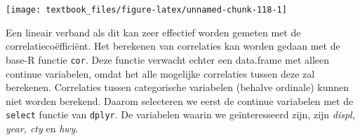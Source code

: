 \documentclass[]{tufte-book}
\newenvironment{Shaded}{}{}
\newcommand{\KeywordTok}[1]{\textcolor[rgb]{0.00,0.44,0.13}{\textbf{#1}}}
\newcommand{\NormalTok}[1]{#1}
\newcommand{\OperatorTok}[1]{\textcolor[rgb]{0.40,0.40,0.40}{#1}}
\newcommand{\StringTok}[1]{\textcolor[rgb]{0.25,0.44,0.63}{#1}}
\begin{document}
\texttt{[image: textbook\_files/figure-latex/unnamed-chunk-118-1]}

Een lineair verband als dit kan zeer effectief worden gemeten met de correlatiecoëfficiënt. Het berekenen van correlaties kan worden gedaan met de base-R functie \texttt{cor}. Deze functie verwacht echter een data.frame met alleen continue variabelen, omdat het alle mogelijke correlaties tussen deze zal berekenen. Correlaties tussen categorische variabelen (behalve ordinale) kunnen niet worden berekend. Daarom selecteren we eerst de continue variabelen met de \texttt{select} functie van \texttt{dplyr}. De variabelen waarin we geïnteresseerd zijn, zijn \emph{displ, year, cty} en \emph{hwy}.

\begin{Shaded}
\end{Shaded}
\end{document}
